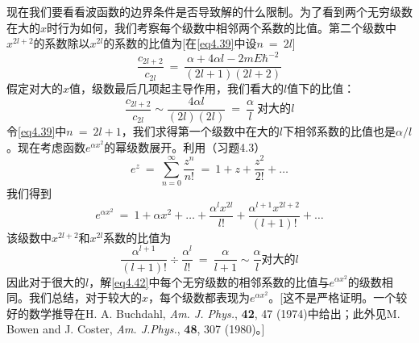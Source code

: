 \documentclass[12pt,a4paper,openany]{ctexbook}
\begin{document}
\begin{flushleft}
现在我们要看看波函数的边界条件是否导致解的什么限制。为了看到两个无穷级数在大的$x$时行为如何，我们考察每个级数中相邻两个系数的比值。第二个级数中$x^{2l+2}$的系数除以$x^{2l}$的系数的比值为[在\eqref{eq4.39}中设$n\ =\ 2l$]
\begin{equation*}
    \frac{c_{2l+2}}{c_{2l}}\ =\ \frac{\alpha+4\alpha l-2mE\hbar^{-2}}{(2l+1)(2l+2)}
\end{equation*}
假定对大的$x$值，级数最后几项起主导作用，我们看大的$l$值下的比值：
\begin{equation}
    \frac{c_{2l+2}}{c_{2l}}\sim\frac{4\alpha l}{(2l)(2l)}\ =\ \frac{\alpha}{l}\ \text{对大的}l \label{eq4.43}
\end{equation}
令\eqref{eq4.39}中$n\ =\ 2l+1$，我们求得第一个级数中在大的$l$下相邻系数的比值也是$\alpha/l$。现在考虑函数$e^{\alpha x^2}$的幂级数展开。利用（习题4.3）
\begin{equation}
    e^z\ =\ \sum_{n=0}^\infty \frac{z^n}{n!}\ =\ 1+z+\frac{z^2}{2!}+\dots \label{eq4.44}
\end{equation}
我们得到
\begin{equation*}
    e^{\alpha x^2}\ =\ 1+\alpha x^2+\dots+\frac{\alpha^lx^{2l}}{l!}+\frac{\alpha^{l+1}x^{2l+2}}{(l+1)!}+\dots
\end{equation*}
该级数中$x^{2l+2}$和$x^{2l}$系数的比值为
\begin{equation*}
    \frac{\alpha^{l+1}}{(l+1)!}\div \frac{\alpha^l}{l!}\ =\ \frac{\alpha}{l+1}\sim \frac{\alpha}{l} \text{对大的}l
\end{equation*}
因此对于很大的$l$，解\eqref{eq4.42}中每个无穷级数的相邻系数的比值与$e^{\alpha x^2}$的级数相同。我们总结，对于较大的$x$，每个级数都表现为$e^{\alpha x^2}$。[这不是严格证明。一个较好的数学推导在H. A. Buchdahl, \textit{Am. J. Phys.}, \textbf{42}, 47 (1974)中给出；此外见M. Bowen and J. Coster, \textit{Am. J.Phys.}, \textbf{48}, 307 (1980)。]


\end{flushleft}
\end{document}
